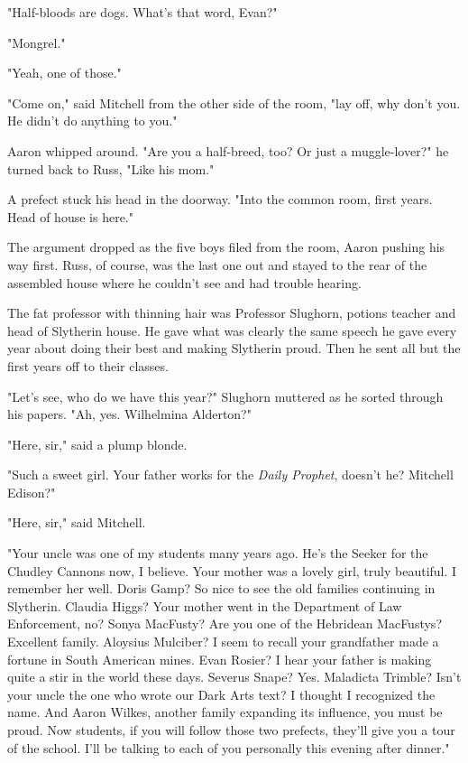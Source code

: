 \documentclass[a4paper,11pt]{article}
\begin{document}
"Half-bloods are dogs. What's that word, Evan?"

"Mongrel."

"Yeah, one of those."

"Come on," said Mitchell from the other side of the room, "lay off, why don't you. He didn't do anything to you."

Aaron whipped around. "Are you a half-breed, too? Or just a muggle-lover?" he turned back to Russ, "Like his mom."

A prefect stuck his head in the doorway. "Into the common room, first years. Head of house is here."

The argument dropped as the five boys filed from the room, Aaron pushing his way first. Russ, of course, was the last one out and stayed to the rear of the assembled house where he couldn't see and had trouble hearing.

The fat professor with thinning hair was Professor Slughorn, potions teacher and head of Slytherin house. He gave what was clearly the same speech he gave every year about doing their best and making Slytherin proud. Then he sent all but the first years off to their classes.

"Let's see, who do we have this year?" Slughorn muttered as he sorted through his papers. "Ah, yes. Wilhelmina Alderton?"

"Here, sir," said a plump blonde.

"Such a sweet girl. Your father works for the \emph{Daily Prophet}, doesn't he? Mitchell Edison?"

"Here, sir," said Mitchell.

"Your uncle was one of my students many years ago. He's the Seeker for the Chudley Cannons now, I believe. Your mother was a lovely girl, truly beautiful. I remember her well. Doris Gamp? So nice to see the old families continuing in Slytherin. Claudia Higgs? Your mother went in the Department of Law Enforcement, no? Sonya MacFusty? Are you one of the Hebridean MacFustys? Excellent family. Aloysius Mulciber? I seem to recall your grandfather made a fortune in South American mines. Evan Rosier? I hear your father is making quite a stir in the world these days. Severus Snape? Yes. Maladicta Trimble? Isn't your uncle the one who wrote our Dark Arts text? I thought I recognized the name. And Aaron Wilkes, another family expanding its influence, you must be proud. Now students, if you will follow those two prefects, they'll give you a tour of the school. I'll be talking to each of you personally this evening after dinner."
\end{document}
